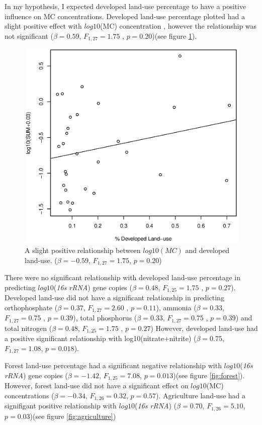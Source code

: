 In my hypothesis, I expected developed land-use percentage to have a positive influence on MC concentrations. Developed land-use percentage plotted had a slight positive effect with $log10$(MC) concentration , however the relationship was not significant  ($\beta=0.59$, $F_{{1,27}}=1.75$ , $p=0.20$)(see figure \ref{fig:developed}).
\begin{figure}[!hp]
	\includegraphics[width=\textwidth]{figures/developed}
	\caption{
A slight positive relationship between $log10(MC)$ and developed land-use. ($\beta=-0.59$, $F_{{1,27}}=1.75$, $p=0.20$)
}
	\label{fig:developed}
\end{figure}
There were no significant relationship with developed land-use percentage in predicting $log10$(\emph{16s rRNA}) gene copies ($\beta=0.48$, $F_{{1,25}}=1.75$ , $p=0.27$). Developed land-use did not have a significant relationship in predicting orthophosphate ($\beta=0.37$, $F_{{1,27}}=2.60$ , $p=0.11$), ammonia ($\beta=0.33$, $F_{{1,27}}=0.75$ , $p=0.39$), total phosphorus  ($\beta=0.33$, $F_{{1,27}}=0.75$ , $p=0.39$) and total nitrogen ($\beta=0.48$, $F_{{1,25}}=1.75$ , $p=0.27$) However, developed land-use had a positive significant relationship with log10(nitrate+nitrite) ($\beta=0.75$, $F_{{1,27}}=1.08$, $p=0.018$). 

Forest land-use percentage had a significant negative relationship with $log10$(\emph{16s rRNA}) gene copies ($\beta=-1.42$, $F_{{1,25}}=7.08$, $p=0.013$)(see figure \ref{fig:forest}). However, forest land-use did not have a significant effect on $log10$(MC) concentrations ($\beta=-0.34$, $F_{{1,26}}=0.32$, $p=0.57$). Agriculture land-use had a signifigant positive relationship with $log10$(\emph{16s rRNA}) ($\beta=0.70$, $F_{{1,26}}=5.10$, $p=0.03$)(see figure \ref{fig:agriculture})

